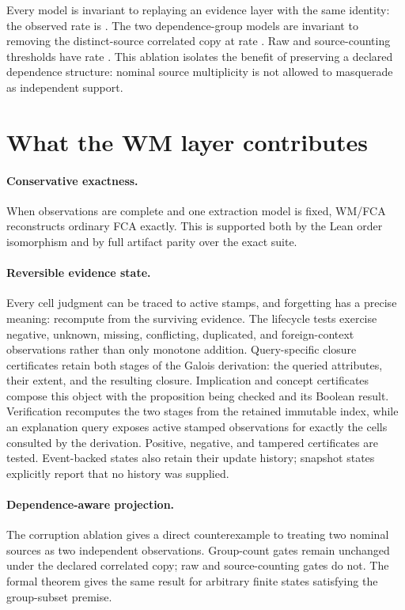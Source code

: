 \documentclass[11pt]{article}
\begin{document}
Every model is invariant to replaying an evidence layer with the same identity:
the observed rate is \WMFCADuplicateInvariantRate. The two dependence-group
models are invariant to removing the distinct-source correlated copy at rate
\WMFCAGroupCopyInvariantRate. Raw and source-counting thresholds have rate
\WMFCARawCopyInvariantRate. This ablation isolates the benefit of preserving a
declared dependence structure: nominal source multiplicity is not allowed to
masquerade as independent support.

\section{What the WM layer contributes}
\label{sec:discussion}

\paragraph{Conservative exactness.}
When observations are complete and one extraction model is fixed, WM/FCA
reconstructs ordinary FCA exactly. This is supported both by the Lean order
isomorphism and by full artifact parity over the exact suite.

\paragraph{Reversible evidence state.}
Every cell judgment can be traced to active stamps, and forgetting has a
precise meaning: recompute from the surviving evidence. The lifecycle tests
exercise negative, unknown, missing, conflicting, duplicated, and
foreign-context observations rather than only monotone addition. Query-specific
closure certificates retain both stages of the Galois derivation: the queried
attributes, their extent, and the resulting closure. Implication and concept
certificates compose this object with the proposition being checked and its
Boolean result. Verification recomputes the two stages from the retained
immutable index, while an explanation query exposes active stamped observations
for exactly the cells consulted by the derivation. Positive, negative, and
tampered certificates are tested. Event-backed states also retain their update
history; snapshot states explicitly report that no history was supplied.

\paragraph{Dependence-aware projection.}
The corruption ablation gives a direct counterexample to treating two nominal
sources as two independent observations. Group-count gates remain unchanged
under the declared correlated copy; raw and source-counting gates do not. The
formal theorem gives the same result for arbitrary finite states satisfying
the group-subset premise.
\end{document}
